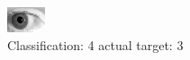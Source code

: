 \begin{figure}[h!]
\begin{center}
\includegraphics[width=0.60\columnwidth]{figures/ID229_class_4_target_3.png}
\end{center}
\caption{ Classification: 4 actual target: 3}
\label{fig:ID229_class_4_target_3}
\end{figure}
